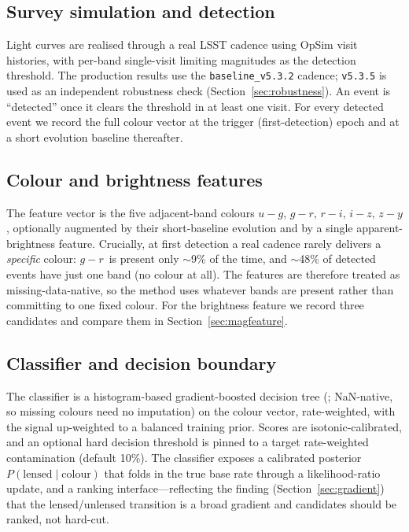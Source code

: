 \documentclass[fleqn,usenatbib]{mnras}
\newcommand{\gr}{$g\!-\!r$}
\begin{document}
\subsection{Survey simulation and detection}
\label{sec:cadence}

Light curves are realised through a real LSST cadence using OpSim visit
histories, with per-band single-visit limiting magnitudes as the detection
threshold. The production results use the \texttt{baseline\_v5.3.2} cadence;
\texttt{v5.3.5} is used as an independent robustness check
(Section~\ref{sec:robustness}). An event is ``detected'' once it clears the
threshold in at least one visit. For every detected event we record the full
colour vector at the trigger (first-detection) epoch and at a short evolution
baseline thereafter.

\subsection{Colour and brightness features}
\label{sec:features}

The feature vector is the five adjacent-band colours
$u\!-\!g,\,g\!-\!r,\,r\!-\!i,\,i\!-\!z,\,z\!-\!y$, optionally augmented by their
short-baseline evolution and by a single apparent-brightness feature. Crucially,
at first detection a real cadence rarely delivers a \emph{specific} colour: \gr\
is present only $\sim$9\% of the time, and $\sim$48\% of detected events have
just one band (no colour at all). The features are therefore treated as
missing-data-native, so the method uses whatever bands are present rather than
committing to one fixed colour. For the brightness feature we record three
candidates and compare them in Section~\ref{sec:magfeature}.

\subsection{Classifier and decision boundary}
\label{sec:classifier}

The classifier is a histogram-based gradient-boosted decision tree
(\citealt{Pedregosa2011}; NaN-native, so missing colours need no imputation) on
the colour vector, rate-weighted, with the signal up-weighted to a balanced
training prior. Scores are isotonic-calibrated, and an optional hard decision
threshold is pinned to a target rate-weighted contamination (default 10\%). The
classifier exposes a calibrated posterior $P(\text{lensed}\mid\text{colour})$
that folds in the true base rate through a likelihood-ratio update, and a
ranking interface---reflecting the finding
(Section~\ref{sec:gradient}) that the lensed/unlensed transition is a broad
gradient and candidates should be ranked, not hard-cut.
\end{document}
